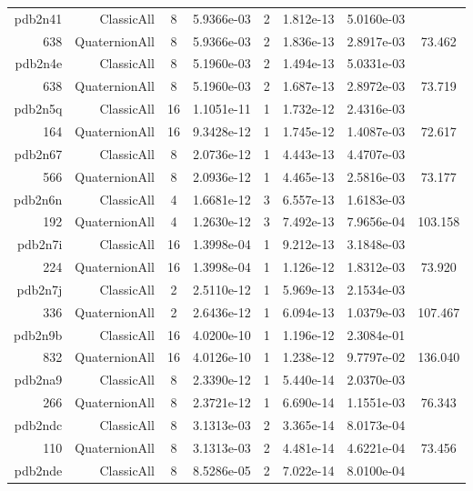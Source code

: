 \begin{xltabular}{\textwidth}{r|rcS[table-format=1.4e+2]cS[table-format=1.3e+2]S[table-format=1.4e+2]S[table-format=-1.3]}
pdb2n41 & ClassicAll & 8 & 5.9366e-03 & 2 & 1.812e-13 & 5.0160e-03 & \\
638 & QuaternionAll & 8 & 5.9366e-03 & 2 & 1.836e-13 & 2.8917e-03 & 73.462\\  \addlinespace
pdb2n4e & ClassicAll & 8 & 5.1960e-03 & 2 & 1.494e-13 & 5.0331e-03 & \\
638 & QuaternionAll & 8 & 5.1960e-03 & 2 & 1.687e-13 & 2.8972e-03 & 73.719\\  \addlinespace
pdb2n5q & ClassicAll & 16 & 1.1051e-11 & 1 & 1.732e-12 & 2.4316e-03 & \\
164 & QuaternionAll & 16 & 9.3428e-12 & 1 & 1.745e-12 & 1.4087e-03 & 72.617\\  \addlinespace
pdb2n67 & ClassicAll & 8 & 2.0736e-12 & 1 & 4.443e-13 & 4.4707e-03 & \\
566 & QuaternionAll & 8 & 2.0936e-12 & 1 & 4.465e-13 & 2.5816e-03 & 73.177\\  \addlinespace
pdb2n6n & ClassicAll & 4 & 1.6681e-12 & 3 & 6.557e-13 & 1.6183e-03 & \\
192 & QuaternionAll & 4 & 1.2630e-12 & 3 & 7.492e-13 & 7.9656e-04 & 103.158\\  \addlinespace
pdb2n7i & ClassicAll & 16 & 1.3998e-04 & 1 & 9.212e-13 & 3.1848e-03 & \\
224 & QuaternionAll & 16 & 1.3998e-04 & 1 & 1.126e-12 & 1.8312e-03 & 73.920\\  \addlinespace
pdb2n7j & ClassicAll & 2 & 2.5110e-12 & 1 & 5.969e-13 & 2.1534e-03 & \\
336 & QuaternionAll & 2 & 2.6436e-12 & 1 & 6.094e-13 & 1.0379e-03 & 107.467\\  \addlinespace
pdb2n9b & ClassicAll & 16 & 4.0200e-10 & 1 & 1.196e-12 & 2.3084e-01 & \\
832 & QuaternionAll & 16 & 4.0126e-10 & 1 & 1.238e-12 & 9.7797e-02 & 136.040\\  \addlinespace
pdb2na9 & ClassicAll & 8 & 2.3390e-12 & 1 & 5.440e-14 & 2.0370e-03 & \\
266 & QuaternionAll & 8 & 2.3721e-12 & 1 & 6.690e-14 & 1.1551e-03 & 76.343\\  \addlinespace
pdb2ndc & ClassicAll & 8 & 3.1313e-03 & 2 & 3.365e-14 & 8.0173e-04 & \\
110 & QuaternionAll & 8 & 3.1313e-03 & 2 & 4.481e-14 & 4.6221e-04 & 73.456\\  \addlinespace
pdb2nde & ClassicAll & 8 & 8.5286e-05 & 2 & 7.022e-14 & 8.0100e-04 & \\

\end{xltabular}

